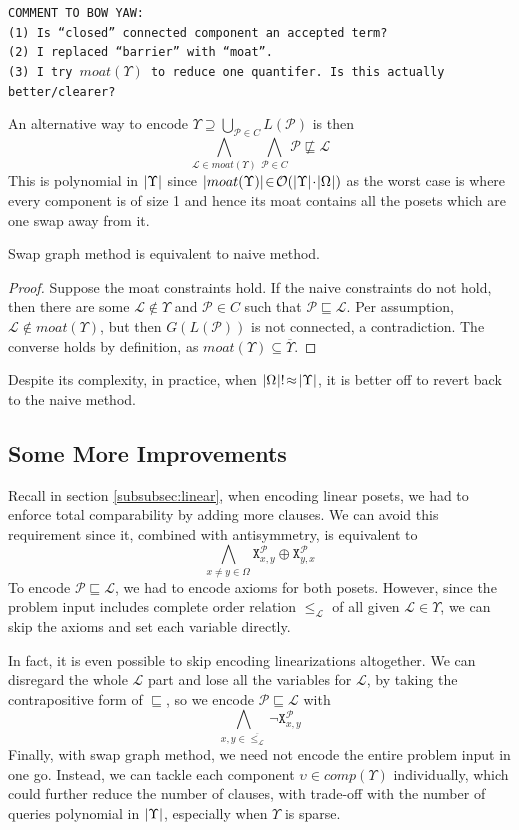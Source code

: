 \documentclass[12pt]{llncs}
\DeclarePairedDelimiter{\abs}{\lvert}{\rvert}
\let\oldleq\leq
\renewcommand{\leq}[1][]{\oldleq_{#1}}
\newcommand{\comment}[1]{\texttt{COMMENT TO BOW YAW:\\#1}}
\newcommand{\poset}[1]{\mathcal{#1}}
\newcommand{\uni}[1][]{\Omega_{#1}}
\newcommand{\lang}[1]{L(#1)}
\newcommand{\sgraph}[1]{G(#1)}
\newcommand{\lext}{\sqsubseteq}
\newcommand{\complmt}[1]{\overline{#1}}
\newcommand{\satvar}[2]{\mathtt{X}_{#1}^{#2}}
\newcommand{\bigo}[1]{\mathcal{O}(#1)}
\begin{document}
\comment{(1) Is ``closed'' connected component an accepted term?\\(2) I replaced ``barrier'' with ``moat''.\\(3) I try $moat(\Upsilon)$ to reduce one quantifer. Is this actually better/clearer?}

An alternative way to encode $\Upsilon \supseteq \bigcup_{\poset{P} \in C} \lang{\poset{P}}$ is then
\[
\bigwedge_{\poset{L} \in moat(\Upsilon)} \bigwedge_{\poset{P} \in C} \poset{P} \not\lext \poset{L}
\]
This is polynomial in $\abs{\Upsilon}$ since $\abs{moat(\Upsilon)} \!\in\! \bigo{\abs{\Upsilon} \!\cdot\! \abs{\uni}}$ as the worst case is where every component is of size 1 and hence its moat contains all the posets which are one swap away from it.

\begin{proposition}
    Swap graph method is equivalent to naive method.
\end{proposition}
\begin{proof}
    Suppose the moat constraints hold. If the naive constraints do not hold, then there are some $\poset{L} \!\not\in\! \Upsilon$ and $\poset{P} \!\in\! C$ such that $\poset{P} \lext \poset{L}$. Per assumption, $\poset{L} \!\not\in\! moat(\Upsilon)$, but then $\sgraph{\lang{\poset{P}}}$ is not connected, a contradiction. The converse holds by definition, as $moat(\Upsilon) \subseteq \complmt{\Upsilon}$.
\end{proof}

Despite its complexity, in practice, when $\abs{\uni}! \!\approx\! \abs{\Upsilon}$, it is better off to revert back to the naive method.

\subsection{Some More Improvements}
Recall in section \ref{subsubsec:linear}, when encoding linear posets, we had to enforce total comparability by adding more clauses. We can avoid this requirement since it, combined with antisymmetry, is equivalent to
\[
\bigwedge_{x \neq y \in \uni} \satvar{x,y}{\poset{P}} \oplus \satvar{y,x}{\poset{P}}
\]
To encode $\poset{P} \lext \poset{L}$, we had to encode axioms for both posets. However, since the problem input includes complete order relation $\leq[\poset{L}]$ of all given $\poset{L} \!\in\! \Upsilon$, we can skip the axioms and set each variable directly.

In fact, it is even possible to skip encoding linearizations altogether. We can disregard the whole $\poset{L}$ part and lose all the variables for $\poset{L}$, by taking the contrapositive form of $\lext$, so we encode $\poset{P} \lext \poset{L}$ with
\[
\bigwedge_{x,y \in \complmt{\leq[\poset{L}]}} \neg \satvar{x,y}{\poset{P}}
\]
Finally, with swap graph method, we need not encode the entire problem input in one go. Instead, we can tackle each component $\upsilon \!\in\! comp(\Upsilon)$ individually, which could further reduce the number of clauses, with trade-off with the number of queries polynomial in $\abs{\Upsilon}$, especially when $\Upsilon$ is sparse.
\end{document}
